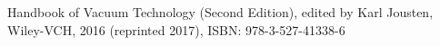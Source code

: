 \documentclass[]{article}
\begin{document}
\newpage
\begin{thebibliography}{9}

 Handbook of Vacuum Technology (Second Edition), edited by Karl Jousten, Wiley-VCH, 2016 (reprinted 2017), ISBN: 978-3-527-41338-6

\end{thebibliography}
\end{document}
